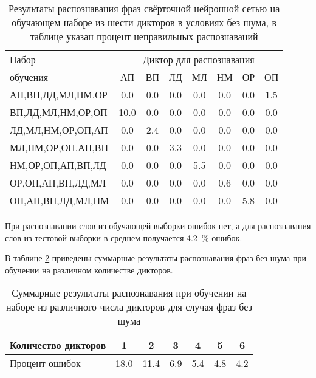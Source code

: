 \begin{table}[h]
	\centering
	\caption{Результаты распознавания фраз свёрточной нейронной сетью на обучающем наборе из шести дикторов в условиях без шума, в таблице указан процент неправильных распознаваний}
	\label{tab:cnn_phrases_6dictors}
	\begin{tabular}{| l | c | c | c | c | c | c | c |}
		\hline
		Набор & \multicolumn{7}{c|}{Диктор для распознавания} \\
		\hhline{~-------}
		обучения & \phantom{0}АП\phantom{0} & \phantom{0}ВП\phantom{0} & \phantom{0}ЛД\phantom{0} & \phantom{0}МЛ\phantom{0} & \phantom{0}НМ\phantom{0} & \phantom{0}ОР\phantom{0} & \phantom{0}ОП\phantom{0} \\
		\hline
		АП,ВП,ЛД,МЛ,НМ,ОР	 &  0.0 &  0.0 &  0.0 &  0.0 &  0.0 &  0.0 &  1.5 \\
		ВП,ЛД,МЛ,НМ,ОР,ОП	 & 10.0 &  0.0 &  0.0 &  0.0 &  0.0 &  0.0 &  0.0 \\
		ЛД,МЛ,НМ,ОР,ОП,АП	 &  0.0 &  2.4 &  0.0 &  0.0 &  0.0 &  0.0 &  0.0 \\
		МЛ,НМ,ОР,ОП,АП,ВП	 &  0.0 &  0.0 &  3.3 &  0.0 &  0.0 &  0.0 &  0.0 \\
		НМ,ОР,ОП,АП,ВП,ЛД	 &  0.0 &  0.0 &  0.0 &  5.5 &  0.0 &  0.0 &  0.0 \\
		ОР,ОП,АП,ВП,ЛД,МЛ	 &  0.0 &  0.0 &  0.0 &  0.0 &  0.6 &  0.0 &  0.0 \\
		ОП,АП,ВП,ЛД,МЛ,НМ	 &  0.0 &  0.0 &  0.0 &  0.0 &  0.0 &  5.8 &  0.0 \\
		\hline
	\end{tabular}
\end{table}

При распознавании слов из обучающей выборки ошибок нет, а для распознавания слов из тестовой выборки в среднем получается 4.2~\% ошибок.

В таблице \ref{tab:cnn_phrases_without_noise_summary} приведены суммарные результаты распознавания фраз без шума при обучении на различном количестве дикторов.

\begin{table}[h]
	\centering
	\caption{Суммарные результаты распознавания при обучении на наборе из различного числа дикторов для случая фраз без шума}
	\label{tab:cnn_phrases_without_noise_summary}
	\begin{tabular}{| l | c | c | c | c | c | c |}
		\hline
		Количество дикторов \phantom{00} & \phantom{00} 1 \phantom{00} & \phantom{00} 2 \phantom{00} & \phantom{00} 3 \phantom{00} & \phantom{00} 4 \phantom{00} & \phantom{00} 5 \phantom{00} & \phantom{00} 6 \phantom{00} \\
		\hline
		Процент ошибок 		& 18.0 & 11.4 & 6.9 & 5.4 & 4.8 & 4.2 \\
		\hline
	\end{tabular}
\end{table}

